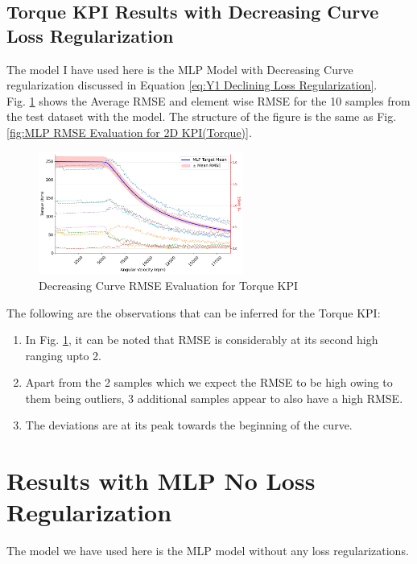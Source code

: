 \documentclass{report} %
\begin{document}
\subsection{Torque KPI Results with Decreasing Curve Loss Regularization}\label{subsec:KPI Results with Decreasing curve Loss Regularization}
The model I have used here is the \ac{MLP} Model with Decreasing Curve regularization discussed in Equation \ref{eq:Y1 Declining Loss Regularization}.\\
Fig. \ref{fig:Decreasing Torque RMSE Evaluation for 2D KPI(Torque)} shows the Average \ac{RMSE} and element wise \ac{RMSE} for the 10 samples from the test dataset 
with the model. The structure of the figure is the same as Fig. \ref{fig:MLP RMSE Evaluation for 2D KPI(Torque)}.

\begin{figure}[H]
    \centering
    \includegraphics[width=0.6\textwidth]{./ReportImages/RMSE_MLP_Decreasing_y1.png} 
    \caption{Decreasing Curve \ac{RMSE} Evaluation for Torque \ac{KPI}} 
    \label{fig:Decreasing Torque RMSE Evaluation for 2D KPI(Torque)}
\end{figure}

The following are the observations that can be inferred for the Torque \ac{KPI}:
\begin{enumerate}[nosep]
    \item In Fig. \ref{fig:Decreasing Torque RMSE Evaluation for 2D KPI(Torque)}, it can be noted that \ac{RMSE} is considerably at its second high 
    ranging upto 2.
    \item Apart from the 2 samples which we expect the \ac{RMSE} to be high owing to them being outliers, 3 additional samples appear to also have a high \ac{RMSE}.
    \item The deviations are at its peak towards the beginning of the curve.
\end{enumerate}

\section{Results with MLP No Loss Regularization}\label{sec:Results with No Loss Regularization}
The model we have used here is the \ac{MLP} model without any loss regularizations.
\end{document}
